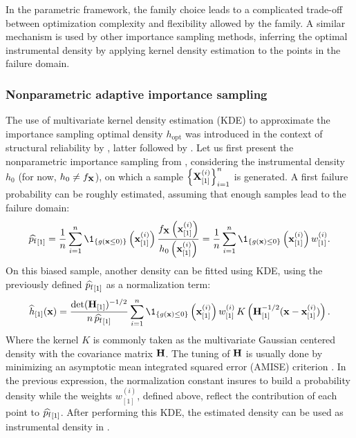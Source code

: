 In the parametric framework, the family choice leads to a complicated trade-off between optimization complexity and flexibility allowed by the family. 
A similar mechanism is used by other importance sampling methods, inferring the optimal instrumental density by applying kernel density estimation to the points in the failure domain. 

\subsubsection{Nonparametric adaptive importance sampling}
The use of multivariate kernel density estimation (KDE) to approximate the importance sampling optimal density $h_{\mathrm{opt}}$ was introduced in the context of structural reliability by \cite{ang_1992_nis}, latter followed by \citet{zhang_1996_NIS}.  
Let us first present the nonparametric importance sampling from \cite{zhang_1996_NIS}, considering the instrumental density $h_0$ (for now, $h_0 \neq f_{\bf X}$), 
on which a sample $\left\{{\bf X}_{[1]}^{(i)}\right\}_{i=1}^n$ is generated. 
A first failure probability can be roughly estimated, assuming that enough samples lead to the failure domain: 
\begin{equation}
    \what{\pf}_{[1]} = \frac1n \sum_{i=1}^{n} \1_{\{g(\bx \leq 0)\}}\left(\bx^{(i)}_{[1]}\right) \frac{f_\bX\left(\bx^{(i)}_{[1]}\right)}{h_0\left(\bx^{(i)}_{[1]}\right)}
    = \frac1n \sum_{i=1}^{n} \1_{\{g(\bx) \leq 0\}}\left(\bx^{(i)}_{[1]}\right) w^{(i)}_{[1]}. 
\end{equation}
On this biased sample, another density can be fitted using KDE, using the previously defined $\widehat{p_\mathrm{f}}_{[1]}$ as a normalization term: 
\begin{equation}
    \what{h}_{[1]}(\bx) = \frac{\mathrm{det}(\bH_{[1]})^{-1/2}}{n \, \what{\pf}_{[1]}} \sum_{i=1}^{n} 
            \1_{\{g(\bx) \leq 0\}}\left(\bx^{(i)}_{[1]}\right) w^{(i)}_{[1]} \, K\left(\bH_{[1]}^{-1/2} (\bx - \bx^{(i)}_{[1]})\right).
\end{equation}
Where the kernel $K$ is commonly taken as the multivariate Gaussian centered density with the covariance matrix ${\bf H}$. 
The tuning of ${\bf H}$ is usually done by minimizing an asymptotic mean integrated squared error (AMISE) criterion \citep{glad_2007_kde_amise}. 
In the previous expression, the normalization constant insures to build a probability density while the weights $w^{(i)}_{[1]}$, defined above, reflect the contribution of each point to $\widehat{p_\mathrm{f}}_{[1]}$.  
After performing this KDE, the estimated density can be used as instrumental density in .

